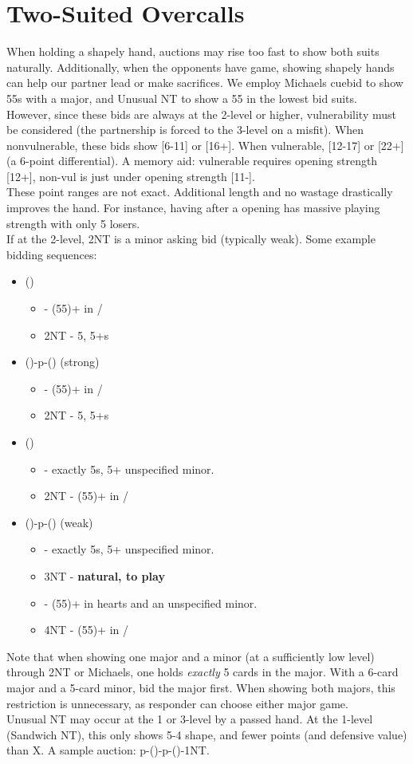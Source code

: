\documentclass[12pt]{report}
\newcommand{\n}{\\}
\newcommand{\ul}[1]{\begin{itemize}#1\end{itemize}}
\newcommand{\li}{\item[~]}
\begin{document}
\section{Two-Suited Overcalls} \label{4:6}

    When holding a shapely hand, auctions may rise too fast to show both suits naturally.  Additionally, when the opponents have game, showing shapely hands can help our partner lead or make sacrifices.  We employ Michaels cuebid to show 55s with a major, and Unusual NT to show a 55 in the lowest bid suits. \n

    However, since these bids are always at the 2-level or higher, vulnerability must be considered (the partnership is forced to the 3-level on a misfit).  When nonvulnerable, these bids show [6-11] or [16+].  When vulnerable, [12-17] or [22+] (a 6-point differential).  A memory aid: vulnerable requires opening strength [12+], non-vul is just under opening strength [11-]. \n
    
    These point ranges are not exact.  Additional length and no wastage drastically improves the hand.  For instance, having   \di{}  after a  opening has massive playing strength with only 5 losers.\n
    
    If at the 2-level, 2NT is a minor asking bid (typically weak).  Some example bidding sequences:

    \ul {
        \li ()
        \ul {
            \li {} - (55)+ in \he{}/\sp{}
            \li 2NT - 5\he{}, 5+\di{}s
        }
        \li (\di1)-p-(\di2) (strong)
        \ul {
            \li \di3 - (55)+ in \he{}/\sp{}
            \li 2NT - 5\he{}, 5+\cl{}s
        }
        \li (\he1)
        \ul {
            \li \sp2 - exactly 5\sp{}s, 5+ unspecified minor.
            \li 2NT - (55)+ in \cl{}/\di{}
        }
        \li (\sp1)-p-(\sp3) (weak)
        \ul {
            \li \sp2 - exactly 5\he{}s, 5+ unspecified minor.
            \li 3NT - \textbf{natural, to play}
            \li \sp4 - (55)+ in hearts and an unspecified minor.
            \li 4NT - (55)+ in \cl{}/\di{}
        }
    }

    Note that when showing one major and a minor (at a sufficiently low level) through 2NT or Michaels, one holds \textit{exactly} 5 cards in the major.  With a 6-card major and a 5-card minor, bid the major first.  When showing both majors, this restriction is unnecessary, as responder can choose either major game. \n

    Unusual NT may occur at the 1 or 3-level by a passed hand.  At the 1-level (Sandwich NT), this only shows 5-4 shape, and fewer points (and defensive value) than X.  A sample auction: p-()-p-()-1NT.
\end{document}
